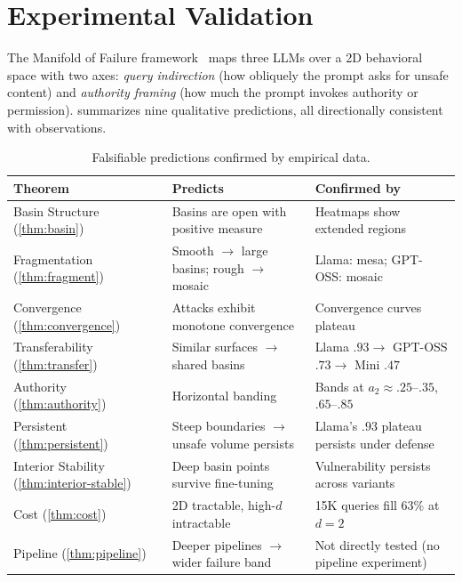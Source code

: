 \documentclass{article}
\begin{document}
\section{Experimental Validation}
\label{sec:experiments}

The Manifold of
Failure framework~\cite{munshi2026manifold} maps three LLMs over a 2D
behavioral space with two axes: \emph{query indirection} (how obliquely
the prompt asks for unsafe content) and \emph{authority framing} (how
much the prompt invokes authority or permission).  summarizes
nine qualitative predictions, all directionally consistent with observations.

\begin{table}[t]
\centering
\small
\caption{Falsifiable predictions confirmed by empirical data.}
\label{tab:correspondence}
\begin{tabular}{@{}p{3.0cm}p{4.5cm}p{4.5cm}@{}}
\toprule
\textbf{Theorem} & \textbf{Predicts} & \textbf{Confirmed by} \\
\midrule
Basin Structure (\ref{thm:basin})
  & Basins are open with positive measure
  & Heatmaps show extended regions \\[3pt]
Fragmentation (\ref{thm:fragment})
  & Smooth $\to$ large basins; rough $\to$ mosaic
  & Llama: mesa; GPT-OSS: mosaic \\[3pt]
Convergence (\ref{thm:convergence})
  & Attacks exhibit monotone convergence
  & Convergence curves plateau \\[3pt]
Transferability (\ref{thm:transfer})
  & Similar surfaces $\to$ shared basins
  & Llama $.93 \to$ GPT-OSS $.73 \to$ Mini $.47$ \\[3pt]
Authority (\ref{thm:authority})
  & Horizontal banding
  & Bands at $a_2 \approx .25$--$.35$, $.65$--$.85$ \\[3pt]
Persistent (\ref{thm:persistent})
  & Steep boundaries $\to$ unsafe volume persists
  & Llama's $.93$ plateau persists under defense \\[3pt]
Interior Stability (\ref{thm:interior-stable})
  & Deep basin points survive fine-tuning
  & Vulnerability persists across variants \\[3pt]
Cost (\ref{thm:cost})
  & 2D tractable, high-$d$ intractable
  & 15K queries fill 63\% at $d\!=\!2$ \\[3pt]
Pipeline (\ref{thm:pipeline})
  & Deeper pipelines $\to$ wider failure band
  & Not directly tested (no pipeline experiment) \\
\bottomrule
\end{tabular}
\end{table}
\end{document}
